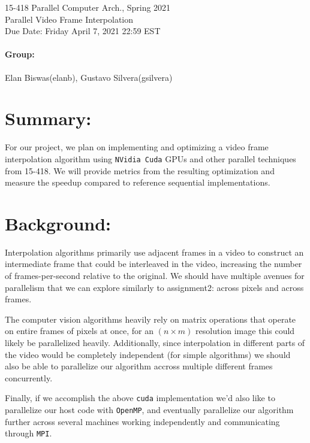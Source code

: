 \documentclass[12pt]{article}
\begin{document}
\begin{centering}
    {\large 15-418 Parallel Computer Arch., Spring 2021\\}
    \vspace{2ex}
    {\LARGE Parallel Video Frame Interpolation\\}
    \vspace{2ex}
    {\large Due Date: Friday April 7, 2021 22:59 EST\\}
\end{centering}

\bigskip

\paragraph{Group:} Elan Biswas(elanb), Gustavo Silvera(gsilvera)

\section*{Summary:} 
\par For our project, we plan on implementing and optimizing a video frame interpolation algorithm using \texttt{NVidia Cuda} GPUs and other parallel techniques from 15-418. We will provide metrics from the resulting optimization and measure the speedup compared to reference sequential implementations.  

\section*{Background:}
\par Interpolation algorithms primarily use adjacent frames in a video to construct an intermediate frame that could be interleaved in the video, increasing the number of frames-per-second relative to the original. We should have multiple avenues for parallelism that we can explore similarly to assignment2: across pixels and across frames. 
\par The computer vision algorithms heavily rely on matrix operations that operate on entire frames of pixels at once, for an $(n \times m)$ resolution image this could likely be parallelized heavily. Additionally, since interpolation in different parts of the video would be completely independent (for simple algorithms) we should also be able to parallelize our algorithm accross multiple different frames concurrently.
\par Finally, if we accomplish the above \texttt{cuda} implementation we'd also like to parallelize our host code with \texttt{OpenMP}, and eventually parallelize our algorithm further across several machines working independently and communicating through \texttt{MPI}.
\end{document}
